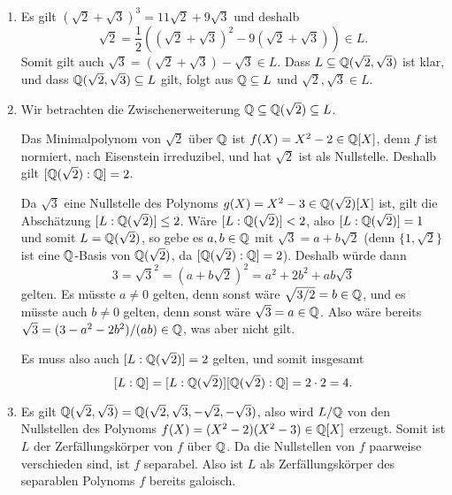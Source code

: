 \begin{solution}
  \begin{enumerate}
    \item
      Es gilt $(\sqrt{2} + \sqrt{3})^3 = 11 \sqrt{2} + 9 \sqrt{3}$ und deshalb
      \[
            \sqrt{2}
        =   \frac{1}{2}\left( (\sqrt{2} + \sqrt{3})^2 - 9(\sqrt{2} + \sqrt{3}) \right)
        \in L.
      \]
      Somit gilt auch $\sqrt{3} = (\sqrt{2} + \sqrt{3}) - \sqrt{3} \in L$.
      Dass $L \subseteq \mathbb{Q}(\sqrt{2}, \sqrt{3})$ ist klar, und dass $\mathbb{Q}(\sqrt{2}, \sqrt{3}) \subseteq L$ gilt, folgt aus $\mathbb{Q} \subseteq L$ und $\sqrt{2}, \sqrt{3} \in L$.
      
    \item
      Wir betrachten die Zwischenerweiterung $\mathbb{Q} \subseteq \mathbb{Q}(\sqrt{2}) \subseteq L$.
      
      Das Minimalpolynom von $\sqrt{2}$ über $\mathbb{Q}$ ist $f(X) = X^2 - 2 \in \mathbb{Q}[X]$, denn $f$ ist normiert, nach Eisenstein irreduzibel, und hat $\sqrt{2}$ ist als Nullstelle.
      Deshalb gilt $[\mathbb{Q}(\sqrt{2}) : \mathbb{Q}] = 2$.
      
      Da $\sqrt{3}$ eine Nullstelle des Polynoms $g(X) = X^2 - 3 \in \mathbb{Q}(\sqrt{2})[X]$ ist, gilt die Abschätzung $[L : \mathbb{Q}(\sqrt{2})] \leq 2$.
      Wäre $[L : \mathbb{Q}(\sqrt{2})] < 2$, also $[L : \mathbb{Q}(\sqrt{2})] = 1$ und somit $L = \mathbb{Q}(\sqrt{2})$, so gebe es $a, b \in \mathbb{Q}$ mit $\sqrt{3} = a + b \sqrt{2}$ (denn $\{1, \sqrt{2}\}$ ist eine $\mathbb{Q}$-Basis von $\mathbb{Q}(\sqrt{2})$, da $[\mathbb{Q}(\sqrt{2}) : \mathbb{Q}] = 2$).
      Deshalb würde dann
      \[
          3
        = \sqrt{3}^2
        = (a + b \sqrt{2})^2
        = a^2 + 2 b^2 + ab \sqrt{3}
      \]
      gelten.
      Es müsste $a \neq 0$ gelten, denn sonst wäre $\sqrt{3/2} = b \in \mathbb{Q}$, und es müsste auch $b \neq 0$ gelten, denn sonst wäre $\sqrt{3} = a \in \mathbb{Q}$.
      Also wäre bereits $\sqrt{3} = (3 - a^2 - 2b^2)/(ab) \in \mathbb{Q}$, was aber nicht gilt.
      
      Es muss also auch $[L : \mathbb{Q}(\sqrt{2})] = 2$ gelten, und somit insgesamt
      \[
          [L : \mathbb{Q}]
        = [L : \mathbb{Q}(\sqrt{2})] [\mathbb{Q}(\sqrt{2}) : \mathbb{Q}]
        = 2 \cdot 2
        = 4.
      \]
      
    \item
      Es gilt $\mathbb{Q}(\sqrt{2}, \sqrt{3}) = \mathbb{Q}(\sqrt{2}, \sqrt{3}, -\sqrt{2}, -\sqrt{3})$, also wird $L/\mathbb{Q}$ von den Nullstellen des Polynoms $f(X) = (X^2 - 2)(X^2 - 3) \in \mathbb{Q}[X]$ erzeugt.
      Somit ist $L$ der Zerfällungskörper von $f$ über $\mathbb{Q}$.
      Da die Nullstellen von $f$ paarweise verschieden sind, ist $f$ separabel.
      Also ist $L$ als Zerfällungskörper des separablen Polynoms $f$ bereits galoisch.
    

\end{enumerate}
\end{solution}
